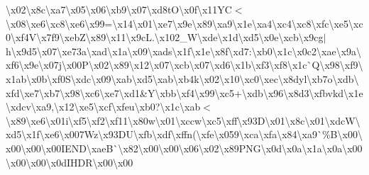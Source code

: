 \textbackslash{}x02\textbackslash{}x8c\textbackslash{}xa7\textbackslash{}x05\textbackslash{}x06\textbackslash{}xb9\textbackslash{}x07\textbackslash{}xd8t\+O\textbackslash{}x0f\textbackslash{}x11\+Y\+C$<$\textbackslash{}x08\textbackslash{}xe6\textbackslash{}xc8\textbackslash{}xe6\textbackslash{}x99=\textbackslash{}x14\textbackslash{}x01\textbackslash{}xe7\textbackslash{}x9e\textbackslash{}x89\textbackslash{}xa9\textbackslash{}x1e\textbackslash{}xa4\textbackslash{}xc4\textbackslash{}xc8\textbackslash{}xfc\textbackslash{}xe5\textbackslash{}xc0\textbackslash{}xf4\+V\textbackslash{}x7f9\textbackslash{}xeb\+Z\textbackslash{}x89\textquotesingle{}\textbackslash{}x11\textbackslash{}x9c\+L.\textbackslash{}x102\+\_\+\+W\textbackslash{}xde\textbackslash{}x1d\textbackslash{}xd5\textbackslash{}x0e\textbackslash{}xcb\textbackslash{}x9cg$\vert$h\textbackslash{}x9d5\textbackslash{}x07\textbackslash{}xe73a\textbackslash{}xad\textbackslash{}x1a\textbackslash{}x09\textbackslash{}xads\textbackslash{}x1f\textbackslash{}x1e\textbackslash{}x8f\textbackslash{}xd7\+:\textbackslash{}xb0\textbackslash{}x1c\textbackslash{}x0c2\textbackslash{}xae\textbackslash{}x9a\textbackslash{}xf6\textbackslash{}x9e\textbackslash{}x07j\textbackslash{}x00\+P\textbackslash{}x02\textbackslash{}x89\textbackslash{}x12\textbackslash{}x07\textbackslash{}xcb\textbackslash{}x07\textbackslash{}xd6\textbackslash{}x1b\textbackslash{}xf3\textbackslash{}xf8\textbackslash{}x1c\`{}\+Q\textbackslash{}x98\textbackslash{}xf9\textbackslash{}x1ab\textbackslash{}x0b\textbackslash{}xf0\+S\textbackslash{}xdc\textbackslash{}x09\textbackslash{}xab\textbackslash{}xd5\textbackslash{}xab\textbackslash{}xb4k\textbackslash{}x02\textbackslash{}x10\textbackslash{}xc0\textbackslash{}xec\textbackslash{}x8dyl\textbackslash{}xb7o\textbackslash{}xdb\textbackslash{}xfd\textbackslash{}xe7\textbackslash{}xb7\textbackslash{}x98\textbackslash{}xc6\textbackslash{}xe7\textbackslash{}xd1\&\+Y\textbackslash{}xbb\textbackslash{}xf4\textbackslash{}x99\textbackslash{}xc5+\textbackslash{}xdb\textbackslash{}x96\textbackslash{}x8d3\textbackslash{}xfbvkd\textbackslash{}x1e\textbackslash{}xdcv\textbackslash{}xa9,\textbackslash{}x12\textbackslash{}xe5\textbackslash{}xcf\textbackslash{}xfeu\textbackslash{}xb0?\textbackslash{}x1c\textbackslash{}xab$<$\textbackslash{}x89\textbackslash{}xe6\textbackslash{}x01i\textbackslash{}xf5\textbackslash{}xf2\textbackslash{}xf11\textbackslash{}x80w\textbackslash{}x01\textbackslash{}xccw\textbackslash{}xc5\textbackslash{}xff\textbackslash{}x93\+D\textbackslash{}x01\textbackslash{}x8c\textbackslash{}x01\textbackslash{}xdc\+W\textbackslash{}xd5\textbackslash{}x1f\textbackslash{}xe6\textbackslash{}x007\+Wz\textbackslash{}x93\+D\+U\textbackslash{}xfb\textbackslash{}xdf\textbackslash{}xffn(\textbackslash{}xfe\textbackslash{}x059\textbackslash{}xca\textbackslash{}xfa\textbackslash{}x84\textbackslash{}xa9\`{}\%\+B\textbackslash{}x00\textbackslash{}x00\textbackslash{}x00\textbackslash{}x00\+I\+E\+N\+D\textbackslash{}xae\+B\`{}\textbackslash{}x82\textbackslash{}x00\textbackslash{}x00\textbackslash{}x06\textbackslash{}x02\textbackslash{}x89\+P\+N\+G\textbackslash{}x0d\textbackslash{}x0a\textbackslash{}x1a\textbackslash{}x0a\textbackslash{}x00\textbackslash{}x00\textbackslash{}x00\textbackslash{}x0d\+I\+H\+D\+R\textbackslash{}x00\textbackslash{}x00\te
